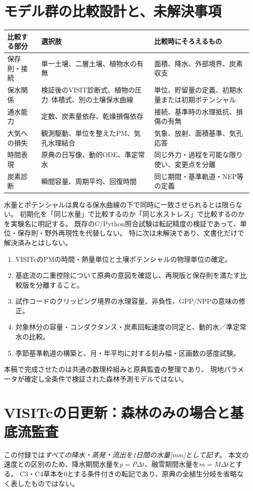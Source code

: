 \documentclass[a4paper,11pt]{ltjsarticle}
\begin{document}
\section{モデル群の比較設計と、未解決事項}
\begin{longtable}{p{.19\linewidth}p{.36\linewidth}p{.39\linewidth}}
\toprule 比較する部分 & 選択肢 & 比較時にそろえるもの\\\midrule\endhead
保存則・接続 & 単一土壌、二層土壌、植物水の有無 & 面積、降水、外部境界、炭素収支\\
保水関係 & 検証後のVISIT診断式、植物の圧力--体積式、別の土壌保水曲線 & 単位、貯留量の定義、初期水量または初期ポテンシャル\\
通水能力 & 定数、炭素量依存、乾燥損傷依存 & 接続、基準時の水理抵抗、損傷の有無\\
大気への損失 & 観測駆動、単位を整えたPM、気孔水理結合 & 気象、放射、面積基準、気孔応答\\
時間表現 & 原典の日写像、動的ODE、準定常水 & 同じ外力・過程を可能な限り使い、変更点を分離\\
炭素診断 & 瞬間容量、周期平均、回復時間 & 同じ期間・基準軌道・NEP等の定義\\
\bottomrule
\end{longtable}
水量とポテンシャルは異なる保水曲線の下で同時に一致させられるとは限らない。
初期化を「同じ水量」で比較するのか「同じ水ストレス」で比較するのかを実験名に明記する。
既存のC/Python照合試験は転記精度の検証であって、単位・保存則・野外再現性を代替しない。
特に次は未解決であり、文書化だけで解決済みとはしない。
\begin{enumerate}
\item VISITcのPMの時間・熱量単位と土壌ポテンシャルの物理単位の確定。
\item 基底流の二重控除について原典の意図を確認し、再現版と保存則を満たす比較版を分離すること。
\item 試作コードのクリッピング境界の水理容量、非負性、GPP/NPPの意味の修正。
\item 対象林分の容量・コンダクタンス・炭素回転速度の同定と、動的水／準定常水の比較。
\item 季節基準軌道の構築と、月・年平均に対する刻み幅・区画数の感度試験。
\end{enumerate}
本稿で完成させたのは共通の数理枠組みと原典監査の整理であり、
現地パラメータが確定し全条件で検証された森林予測モデルではない。

\appendix
\section{VISITcの日更新：森林のみの場合と基底流監査}\label{app:native}
この付録では\emph{すべての降水・蒸発・流出を1日間の水量[mm]として記す}。
本文の速度との区別のため、降水期間水量を$p=P\Delta t$、融雪期間水量を$m=M\Delta t$とする。
C3・C4草本を0とする条件付きの転記であり、原典の全植生分岐を省略なく表したものではない。
\end{document}
